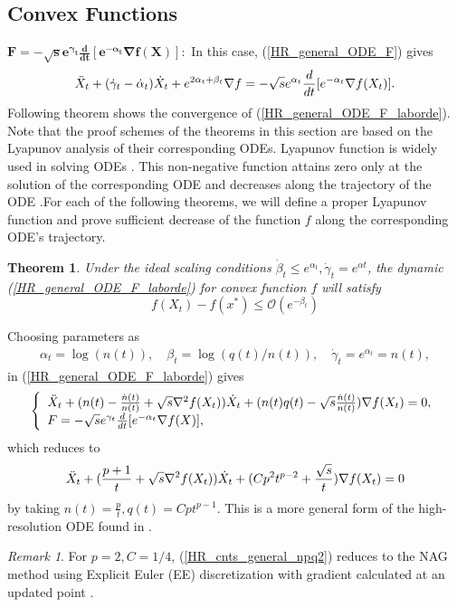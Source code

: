 \documentclass{article}
\theoremstyle{plain}
\newtheorem{theorem}{Theorem}[section]
\theoremstyle{definition}
\theoremstyle{remark}
\newtheorem{remark}{Remark}[theorem]
\begin{document}
\subsection{Convex Functions}
$\boldsymbol {F = -\sqrt{s}e^{\gamma_t}\frac{d}{dt}[e^{-\alpha_t}\nabla f(X)]}:$ 
    In this case, (\ref{HR_general_ODE_F}) gives
    \begin{align}\label{HR_general_ODE_F_laborde}
    \Ddot{X}_t + (\dot{\gamma}_t-\dot{\alpha}_t)\dot{X}_t+e^{2\alpha_t+\beta_t}\nabla f = -\sqrt{s}e^{\alpha_t}\frac{d}{dt}[e^{-\alpha_t}\nabla f(X_t)].
\end{align}
Following theorem shows the convergence of (\ref{HR_general_ODE_F_laborde}). Note that the proof schemes of the theorems in this section are based on the Lyapunov analysis of their corresponding ODEs. Lyapunov function is widely used in solving ODEs \citep{siegel2019accelerated,shi2019acceleration,attouch2020first,attouch2021convergence}. This non-negative function attains zero only at the solution of the corresponding ODE and decreases along the trajectory of the ODE \citep{khalil2002nonlinear}.For each of the following theorems, we will define a proper Lyapunov function and prove sufficient decrease of the function \(f\) along the corresponding ODE's trajectory.
\begin{theorem}\label{Theorem_ODE_laborde}
Under the ideal scaling conditions $\dot\beta_t\leq e^{\alpha_t}, \dot\gamma_t=e^{\alpha t}$, the dynamic (\ref{HR_general_ODE_F_laborde}) for convex function $f$ will satisfy 
$$f(X_t)-f(x^*)\leq \mathcal{O}(e^{-\beta_t})$$
\end{theorem}

Choosing parameters as
\begin{align}\label{prams_general}
        \alpha_t=\log (n(t)),\quad
    \beta_t=\log (q(t)/n(t)),\quad
    \dot\gamma_t=e^{\alpha_t}=n(t),
\end{align}
in (\ref{HR_general_ODE_F_laborde}) gives
\begin{align}\label{HR_cnts_general_npq_laborde}
\left\{
\begin{array}{l}
     \Ddot{X}_t + (n(t)-\frac{\dot n(t)}{n(t)}+\sqrt{s}\nabla^2 f(X_t))\dot{X}_t+(n(t)q(t)-\sqrt{s} \frac{\dot n(t)}{n(t)})\nabla f(X_t)=0,   \\
    F = -\sqrt{s}e^{\gamma_t}\frac{d}{dt}[e^{-\alpha_t}\nabla f(X)],  
\end{array}\right.
\end{align}
which reduces to 
\begin{align}\label{HR_cnts_general_npq2}
     \Ddot{X}_t + (\frac{p+1}{t}+\sqrt{s}\nabla^2 f(X_t))\dot{X}_t+(Cp^2t^{p-2}+\frac{\sqrt{s}}{t})\nabla f(X_t)=0
\end{align}
by taking $n(t)=\frac{p}{t},q(t)=Cpt^{p-1}$. This is a more general form of the high-resolution ODE found in \citep{pmlr-v108-laborde20a}. 
\begin{remark}
For \(p=2,C=1/4\), (\ref{HR_cnts_general_npq2}) reduces to the NAG method using Explicit Euler (EE) discretization with gradient calculated at an updated point \citep{pmlr-v108-laborde20a}.
\end{remark}
\end{document}
